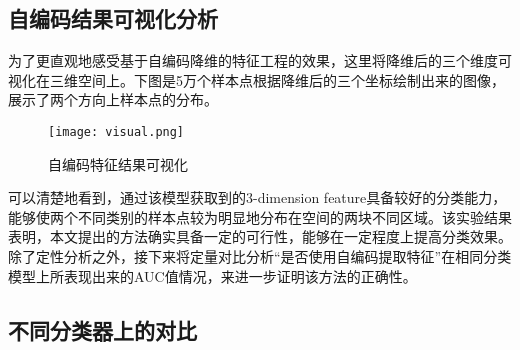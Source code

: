 \subsection{自编码结果可视化分析}
为了更直观地感受基于自编码降维的特征工程的效果，这里将降维后的三个维度可视化在三维空间上。下图是5万个样本点根据降维后的三个坐标绘制出来的图像，展示了两个方向上样本点的分布。

\begin{figure}[H]
    \centering
    \texttt{[image: visual.png]}
    \caption{自编码特征结果可视化}
    \label{fig:visual}
\end{figure}

可以清楚地看到，通过该模型获取到的3-dimension feature具备较好的分类能力，能够使两个不同类别的样本点较为明显地分布在空间的两块不同区域。该实验结果表明，本文提出的方法确实具备一定的可行性，能够在一定程度上提高分类效果。\\

除了定性分析之外，接下来将定量对比分析“是否使用自编码提取特征”在相同分类模型上所表现出来的AUC值情况，来进一步证明该方法的正确性。

\subsection{不同分类器上的对比}
